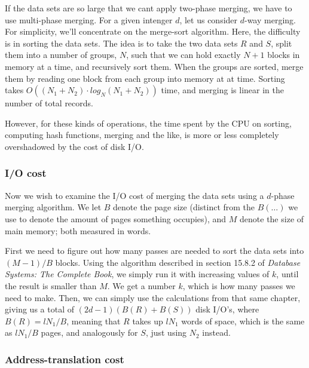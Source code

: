 \documentclass[a4paper, 12pt]{article}
\begin{document}
If the data sets are so large that we cant apply two-phase merging, we
have to use multi-phase merging. For a given intenger $d$, let us
consider $d$-way merging. For simplicity, we'll concentrate on the
merge-sort algorithm. Here, the difficulty is in sorting the data
sets. The idea is to take the two data sets $R$ and $S$, split them
into a number of groups, $N$, such that we can hold exactly $N+1$
blocks in memory at a time, and recursively sort them. When the groups
are sorted, merge them by reading one block from each group into
memory at at time. Sorting takes $O((N_1 + N_2) \cdot log_N(N_1 +
N_2))$ time, and merging is linear in the number of total records.

However, for these kinds of operations, the time spent by the CPU on
sorting, computing hash functions, merging and the like, is more or
less completely overshadowed by the cost of disk I/O.

\subsubsection*{I/O cost}


Now we wish to examine the I/O cost of merging the data sets using a
$d$-phase merging algorithm. We let $B$ denote the page size (distinct
from the $B(\ldots)$ we use to denote the amount of pages something
occupies), and $M$ denote the size of main memory; both measured in
words.

First we need to figure out how many passes are needed to sort the
data sets into $(M-1)/B$ blocks. Using the algorithm described in
section 15.8.2 of \emph{Database Systems: The Complete Book}, we
simply run it with increasing values of $k$, until the result is
smaller than $M$. We get a number $k$, which is how many passes we
need to make. Then, we can simply use the calculations from that same
chapter, giving us a total of $(2d-1)(B(R) + B(S))$ disk I/O's, where
$B(R) = lN_1 / B$, meaning that $R$ takes up $lN_1$ words of space,
which is the same as $lN_1 / B$ pages, and analogously for $S$, just
using $N_2$ instead.

\subsubsection*{Address-translation cost}
\end{document}

